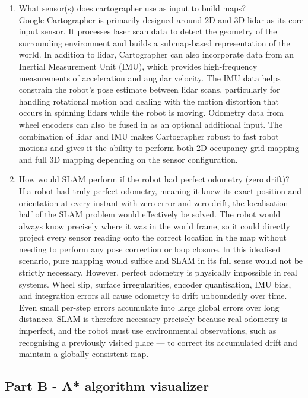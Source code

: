 \documentclass[11 pt , a 4 paper ]{article}
\theoremstyle{definition}
\begin{document}
\begin{enumerate}
    \item What sensor(s) does cartographer use as input to build maps?\\ 
      \newline \noindent Google Cartographer is primarily designed around 2D and 3D lidar as its core input sensor. It processes laser scan data to detect the geometry of the surrounding environment and builds a submap-based representation of the world. In addition to lidar, Cartographer can also incorporate data from an Inertial Measurement Unit (IMU), which provides high-frequency measurements of acceleration and angular velocity. The IMU data helps constrain the robot's pose estimate between lidar scans, particularly for handling rotational motion and dealing with the motion distortion that occurs in spinning lidars while the robot is moving. Odometry data from wheel encoders can also be fused in as an optional additional input. The combination of lidar and IMU makes Cartographer robust to fast robot motions and gives it the ability to perform both 2D occupancy grid mapping and full 3D mapping depending on the sensor configuration.
    \item How would SLAM perform if the robot had perfect odometry (zero drift)?\\ 
      \newline \noindent If a robot had truly perfect odometry, meaning it knew its exact position and orientation at every instant with zero error and zero drift,  the localisation half of the SLAM problem would effectively be solved. The robot would always know precisely where it was in the world frame, so it could directly project every sensor reading onto the correct location in the map without needing to perform any pose correction or loop closure. In this idealised scenario, pure mapping would suffice and SLAM in its full sense would not be strictly necessary. However, perfect odometry is physically impossible in real systems. Wheel slip, surface irregularities, encoder quantisation, IMU bias, and integration errors all cause odometry to drift unboundedly over time. Even small per-step errors accumulate into large global errors over long distances. SLAM is therefore necessary precisely because real odometry is imperfect, and the robot must use environmental observations, such as recognising a previously visited place — to correct its accumulated drift and maintain a globally consistent map.

  \end{enumerate}
  \subsection*{Part B - A* algorithm visualizer}
\end{document}
